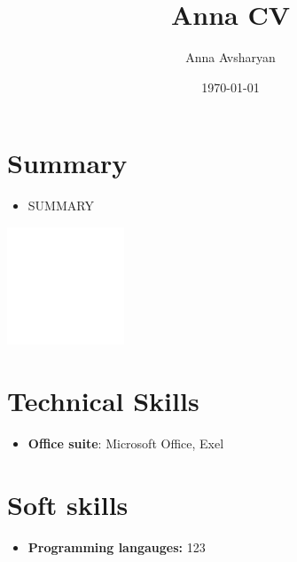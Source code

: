 \documentclass{article}
\title{ Anna CV}
\author{Anna Avsharyan}
\date{\today}
\begin{document}
 
\makecvtitle %

\section{Summary}
\begin{minipage}{0.7\textwidth}
   \begin{itemize}
      \item SUMMARY
      \end{itemize}
   \end{minipage}%
   \hfill
   \begin{minipage}{0.3\textwidth}
      \includegraphics[width=3.5cm,right]{picture.jpg}
\end{minipage}%





\section{Technical Skills}

\begin{itemize}
\item \textbf{Office suite}: Microsoft Office, Exel 
\end{itemize}
 
\section{Soft skills}
\begin{itemize}
\item \textbf{Programming langauges:} 123
\end{itemize}
\end{document}
